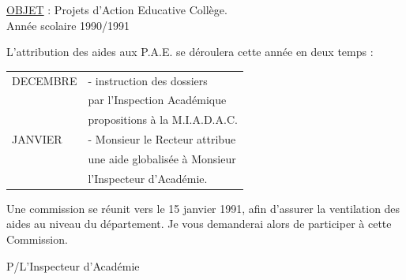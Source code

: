 \uline{OBJET} : Projets d'Action Educative Collège.\\
Année scolaire 1990/1991

L'attribution des aides aux P.A.E. se déroulera cette année en deux temps :

\begin{tabular}{l p{.72\linewidth}}
DECEMBRE & - instruction des dossiers\\
&par l'Inspection Académique\\[1em]
&propositions à la M.I.A.D.A.C.\\[1em]
JANVIER & - Monsieur le Recteur attribue\\
&une aide globalisée à Monsieur\\
&l'Inspecteur d'Académie.
\end{tabular}

Une commission se réunit vers le 15 janvier 1991, afin d'assurer la ventilation des aides au niveau du département. Je vous demanderai alors de participer à cette Commission.

P/L'Inspecteur d'Académie




